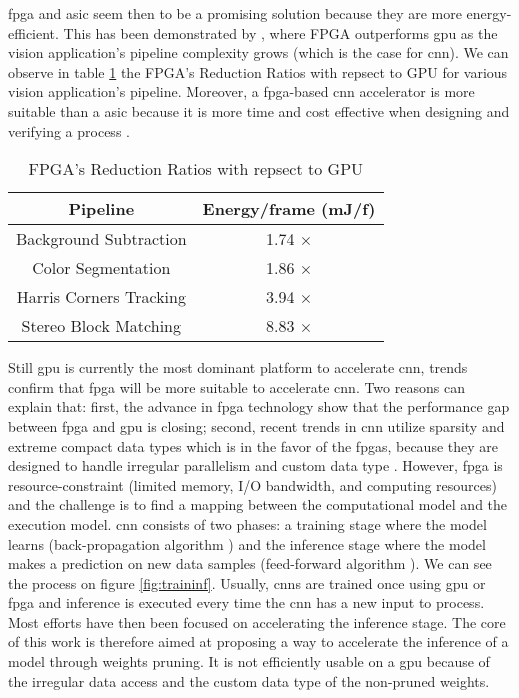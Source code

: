 \acrshort{fpga} and \acrshort{asic} seem then to be a promising solution because they are more energy-efficient. This has been demonstrated by \cite{qasaimeh_comparing_2019}, where FPGA outperforms \acrshort{gpu} as the vision application’s pipeline complexity grows (which is the case for \acrshort{cnn}). We can observe in table \ref{tab:benchener} the FPGA’s Reduction Ratios with repsect to GPU for various vision application’s pipeline. Moreover, a \acrshort{fpga}-based \acrshort{cnn} accelerator is more suitable than a \acrshort{asic} because it is more time and cost effective when designing and verifying a process \cite{motamedi_placid_2017}.
\begin{table}
    \center
    \begin{tabular}{|c|c|}
        \hline
        Pipeline & Energy/frame (mJ/f) \\
        \hline
        Background Subtraction & 1.74 $\times$\\
        \hline
        Color Segmentation & 1.86 $\times$ \\
        \hline
        Harris Corners Tracking & 3.94 $\times$ \\
        \hline
        Stereo Block Matching & 8.83 $\times$ \\
        \hline
    \end{tabular}
    \caption{FPGA’s Reduction Ratios with repsect to GPU \cite{qasaimeh_comparing_2019}}
    \label{tab:benchener}
\end{table} \newline \newline
%
Still \acrshort{gpu} is currently the most dominant platform to accelerate \acrshort{cnn}, trends confirm that \acrshort{fpga} will be more suitable to accelerate \acrshort{cnn}. Two reasons can explain that: first, the advance in \acrshort{fpga} technology show that the performance gap between \acrshort{fpga} and \acrshort{gpu} is closing; second, recent trends in \acrshort{cnn} utilize sparsity and extreme compact data types which is in the favor of the \acrshort{fpga}s, because they are designed to handle irregular parallelism and custom data type \cite{nurvitadhi_can_2017}. However, \acrshort{fpga} is resource-constraint (limited memory, I/O bandwidth, and computing resources) and the challenge is to find a mapping between the computational model and the execution model. \newline \newline
%
\acrshort{cnn} consists of two phases: a training stage where the model learns (back-propagation algorithm \cite{lecun_backpropagation_1989}) and the inference stage where the model makes a prediction on new data samples (feed-forward algorithm \cite{zhang_optimizing_2015}). We can see the process on figure \ref{fig:traininf}. Usually, \acrshort{cnn}s are trained once using \acrshort{gpu} or \acrshort{fpga} and inference is executed every time the \acrshort{cnn} has a new input to process. Most efforts have then been focused on accelerating the inference stage. The core of this work is therefore aimed at proposing a way to accelerate the inference of a model through weights pruning. It is not efficiently usable on a \acrshort{gpu} because of the irregular data access and the custom data type of the non-pruned weights.

